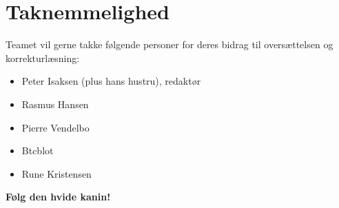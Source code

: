 \section*{Taknemmelighed}

Teamet vil gerne takke følgende personer for deres bidrag til
oversættelsen og korrekturlæsning:

\begin{itemize}
\item Peter Isaksen (plus hans hustru), redaktør
\item Rasmus Hansen
\item Pierre Vendelbo
\item Btcblot
\item Rune Kristensen
\end{itemize}

\textbf{Følg den hvide kanin!}
